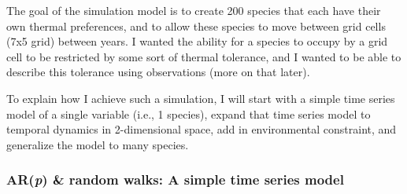 \documentclass{article}\usepackage[]{graphicx}\usepackage[]{color}
\begin{document}
\par
The goal of the simulation model is to create 200 species that each have their own thermal preferences, and to allow these species to move between grid cells (7x5 grid) between years. I wanted the ability for a species to occupy by a grid cell to be restricted by some sort of thermal tolerance, and I wanted to be able to describe this tolerance using observations (more on that later).

\par
To explain how I achieve such a simulation, I will start with a simple time series model of a single variable (i.e., 1 species), expand that time series model to temporal dynamics in 2-dimensional space, add in environmental constraint, and generalize the model to many species.

\subsubsection{AR(\emph{p}) \& random walks: A simple time series model}
\end{document}
